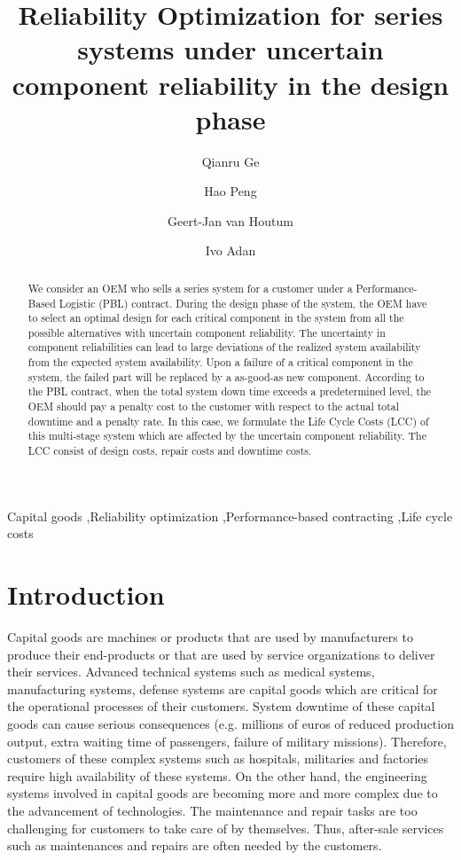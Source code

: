 \documentclass[preprint,12pt]{elsarticle}
\begin{document}
\nocite{*}

\begin{frontmatter}
\title{Reliability Optimization for series systems under uncertain component reliability in the design phase}
\author[label1]{Qianru Ge}
\author[label1]{Hao Peng}
\author[label1]{Geert-Jan van Houtum}
\author[label1]{Ivo Adan}



\address[label1]{Department of Industrial Engineering and Innovation Sciences, Eindhoven University of Technology, Eindhoven, The Netherlands}

\begin{abstract}
We consider an OEM who sells a series system for a customer under a Performance-Based Logistic (PBL) contract. During the design phase of the system, the OEM have to select an optimal design for each critical component in the system from all the possible alternatives with uncertain component reliability. The uncertainty  in component reliabilities can lead to large deviations of the realized system availability from the expected system availability. Upon a failure of a critical component in the system, the failed part will be replaced by a as-good-as new component. According to the PBL contract, when the total system down time exceeds a predetermined level, the OEM should pay a penalty cost to the customer with respect to the actual total downtime and a penalty rate. In this case, we formulate the Life Cycle Costs (LCC) of this multi-stage system which are affected by the uncertain component reliability. The LCC consist of design costs, repair costs and downtime costs.
\end{abstract}

\begin{keyword}
Capital goods \sep Reliability optimization  \sep Performance-based contracting \sep Life cycle costs
\end{keyword}
\end{frontmatter}
\section{Introduction}
Capital goods are machines or products that are used by manufacturers to produce their end-products or that are used by service organizations to deliver their services. Advanced technical systems such as medical systems, manufacturing systems, defense systems are capital goods which are critical for the operational processes of their customers. System downtime of these capital goods can cause serious consequences (e.g. millions of euros of reduced production output, extra waiting time of passengers, failure of military missions). Therefore, customers of these complex systems such as hospitals, militaries and factories require high availability of these systems. On the other hand, the engineering systems involved in capital goods are becoming more and more complex due to the advancement of technologies. The maintenance and repair tasks are too challenging for customers to take care of by themselves. Thus, after-sale services such as maintenances and repairs are often needed by the customers.
\end{document}
